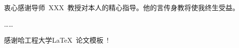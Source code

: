 \begin{acknowledgements}
  衷心感谢导师~XXX~教授对本人的精心指导。他的言传身教将使我终生受益。

  ……

  感谢哈工程大学\LaTeX\ 论文模板\heuthesis\ !

\end{acknowledgements}
